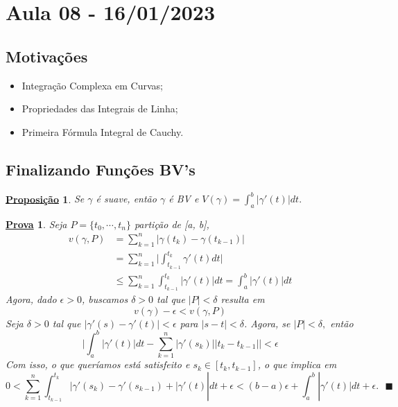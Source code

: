 \documentclass{article}
\newtheorem*{proof*}{\underline{Prova}}
\newtheorem*{prop*}{\underline{Proposi\c c\~ao}}
\renewcommand\qedsymbol{$\blacksquare$}
\begin{document}
  \section{Aula 08 - 16/01/2023}
  \subsection{Motiva\c c\~oes}
  \begin{itemize}
    \item Integra\c c\~ao Complexa em Curvas;
    \item Propriedades das Integrais de Linha;
    \item Primeira F\'ormula Integral de Cauchy.
  \end{itemize}
  \subsection{Finalizando Fun\c c\~oes BV's}
  \begin{prop*}
    Se $\gamma$ \'e suave, ent\~ao $\gamma$ \'e BV e $V(\gamma) = \int_{a}^{b}|\gamma'(t)|dt.$
  \end{prop*}
  \begin{proof*}
    Seja $P=\{t_{0}, \cdots, t_n\} $ parti\c c\~ao de [a, b], 
    \begin{align*}
      v(\gamma, P) &= \sum\limits_{k=1}^{n}|\gamma(t_{k}) - \gamma(t_{k-1})|\\
                   &= \sum\limits_{k=1}^{n}\biggl|\int_{t_{k-1}}^{t_{k}}\gamma'(t)dt\biggr|\\
                   &\leq \sum\limits_{k=1}^{n}\int_{t_{k-1}}^{t_{k}}|\gamma'(t)|dt = \int_{a}^{b}|\gamma'(t)|dt
    \end{align*}
    Agora, dado $\epsilon > 0$, buscamos $\delta > 0$ tal que $|P| < \delta$ resulta em 
    $$
    v(\gamma) - \epsilon < v(\gamma, P)
    $$
    Seja $\delta > 0$ tal que $|\gamma'(s) - \gamma'(t)| < \epsilon$ para $|s - t| < \delta$. Agora, se $|P| < \delta,$ ent\~ao
    $$
    \biggl|\int_{a}^{b}|\gamma'(t)|dt - \sum\limits_{k=1}^{n}|\gamma'(s_{k})||t_{k}-t_{k-1}|\biggr| < \epsilon
    $$
    Com isso, o que quer\'iamos est\'a satisfeito e $s_{k}\in{[t_{k}, t_{k-1}]}$, o que implica em 
    $$
    0 < \sum\limits_{k=1}^{n}\int_{t_{k-1}}^{t_{k}}|\gamma'(s_{k}) - \gamma'(s_{k-1}) + |\gamma'(t)| dt + \epsilon < (b-a)\epsilon + 
    \int_{a}^{b}|\gamma'(t)|dt + \epsilon. \text{ \qedsymbol}
    $$
  \end{proof*}
\end{document}

